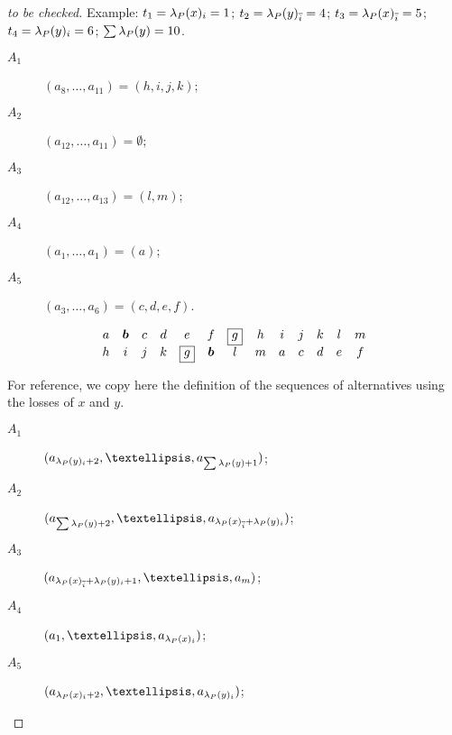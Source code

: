 \documentclass[pagesize, twoside=off, bibliography=totoc, DIV=calc, fontsize=12pt, a4paper]{scrartcl}
\begin{document}
\begin{proof}[to be checked]
Example: $t_1 = \lambda_P(x)_i = 1$; $t_2 = \lambda_P(y)_{\overline{i}} = 4$; $t_3 = \lambda_P(x)_{\overline{i}} = 5$; $t_4 = \lambda_P(y)_i = 6$; $\sum \lambda_P(y) = 10$.
	\begin{description}
		\item[$A_1$] $(a_8, …, a_{11}) = (h, i, j, k)$;
		\item[$A_2$] $(a_{12}, …, a_{11}) = \emptyset$;
		\item[$A_3$] $(a_{12}, …, a_{13}) = (l, m)$;
		\item[$A_4$] $(a_1, …, a_1) = (a)$;
		\item[$A_5$] $(a_3, …, a_6) = (c, d, e, f)$.
	\end{description}
  \begin{equation}
    \begin{array}{*{13}c}
      a&\bm{b}&c&d&e&f&\boxed{g}&h&i&j&k&l&m\\
      h&i&j&k&\boxed{g}&\bm{b}&l&m&a&c&d&e&f
    \end{array}
  \end{equation}

	For reference, we copy  here the definition of the sequences of alternatives using the losses of $x$ and $y$.
	\begin{description}
		\item[$A_1$] $(a_{\lprof(y)_i + 2}, …, a_{\sum \lprof(y) + 1})$;
		\item[$A_2$] $(a_{\sum \lprof(y) + 2}, …, a_{\lprof(x)_{\ibar} + \lprof(y)_i})$;
		\item[$A_3$] $(a_{\lprof(x)_{\ibar} + \lprof(y)_i + 1}, …, a_m)$;
		\item[$A_4$] $(a_1, …, a_{\lprof(x)_i})$;
		\item[$A_5$] $(a_{\lprof(x)_i + 2}, …, a_{\lprof(y)_i})$;
	\end{description}
\end{proof}
\end{document}
